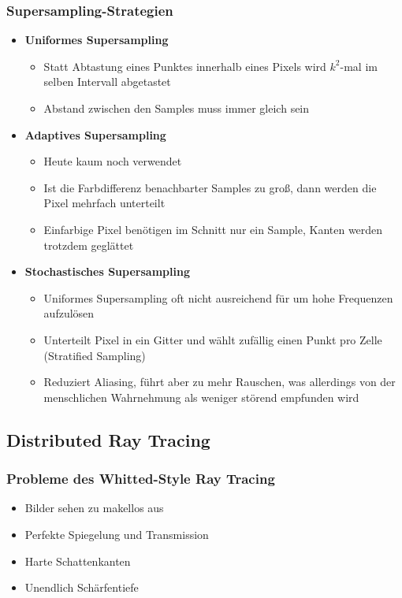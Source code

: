 \subsubsection{Supersampling-Strategien}
\begin{itemize}
	\item \textbf{Uniformes Supersampling}
	\begin{itemize}
		\item Statt Abtastung eines Punktes innerhalb eines Pixels wird \(k^2\)-mal im selben Intervall abgetastet
		\item Abstand zwischen den Samples muss immer gleich sein
	\end{itemize}
	\item \textbf{Adaptives Supersampling}
	\begin{itemize}
		\item Heute kaum noch verwendet
		\item Ist die Farbdifferenz benachbarter Samples zu groß, dann werden die Pixel mehrfach unterteilt
		\item Einfarbige Pixel benötigen im Schnitt nur ein Sample, Kanten werden trotzdem geglättet
	\end{itemize}
	\item \textbf{Stochastisches Supersampling}
	\begin{itemize}
		\item Uniformes Supersampling oft nicht ausreichend für um hohe Frequenzen aufzulösen
		\item Unterteilt Pixel in ein Gitter und wählt zufällig einen Punkt pro Zelle (Stratified Sampling)
		\item Reduziert Aliasing, führt aber zu mehr Rauschen, was allerdings von der menschlichen Wahrnehmung als weniger störend empfunden wird
	\end{itemize}
\end{itemize}


\subsection{Distributed Ray Tracing}

\subsubsection{Probleme des Whitted-Style Ray Tracing}
\begin{itemize}
	\item Bilder sehen zu makellos aus
	\item Perfekte Spiegelung und Transmission
	\item Harte Schattenkanten
	\item Unendlich Schärfentiefe
\end{itemize}

